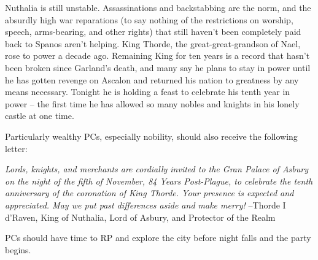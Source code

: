 \documentclass{report}
\theoremstyle{definition}
\begin{document}
\begin{displayquote}
Nuthalia is still unstable. Assassinations and backstabbing are the norm, and the absurdly high war reparations (to say nothing of the restrictions on worship, speech, arms-bearing, and other rights) that still haven't been completely paid back to Spanos aren't helping. King Thorde, the great-great-grandson of Nael, rose to power a decade ago. Remaining King for ten years is a record that hasn't been broken since Garland's death, and many say he plans to stay in power until he has gotten revenge on Ascalon and returned his nation to greatness by any means necessary. Tonight he is holding a feast to celebrate his tenth year in power -- the first time he has allowed so many nobles and knights in his lonely castle at one time.
\end{displayquote}
Particularly wealthy PCs, especially nobility, should also receive the following letter:
\begin{displayquote}
\textit{Lords, knights, and merchants are cordially invited to the Gran Palace of Asbury on the night of the fifth of November, 84 Years Post-Plague, to celebrate the tenth anniversary of the coronation of King Thorde. Your presence is expected and appreciated. May we put past differences aside and make merry!}
\newline
--Thorde I d'Raven, King of Nuthalia, Lord of Asbury, and Protector of the Realm
\end{displayquote}
PCs should have time to RP and explore the city before night falls and the party begins.
\end{document}

